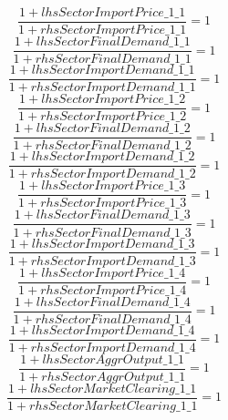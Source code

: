 \begin{dmath}
\frac{1+{lhsSectorImportPrice\_1\_1}}{1+{rhsSectorImportPrice\_1\_1}}=1
\end{dmath}
\begin{dmath}
\frac{1+{lhsSectorFinalDemand\_1\_1}}{1+{rhsSectorFinalDemand\_1\_1}}=1
\end{dmath}
\begin{dmath}
\frac{1+{lhsSectorImportDemand\_1\_1}}{1+{rhsSectorImportDemand\_1\_1}}=1
\end{dmath}
\begin{dmath}
\frac{1+{lhsSectorImportPrice\_1\_2}}{1+{rhsSectorImportPrice\_1\_2}}=1
\end{dmath}
\begin{dmath}
\frac{1+{lhsSectorFinalDemand\_1\_2}}{1+{rhsSectorFinalDemand\_1\_2}}=1
\end{dmath}
\begin{dmath}
\frac{1+{lhsSectorImportDemand\_1\_2}}{1+{rhsSectorImportDemand\_1\_2}}=1
\end{dmath}
\begin{dmath}
\frac{1+{lhsSectorImportPrice\_1\_3}}{1+{rhsSectorImportPrice\_1\_3}}=1
\end{dmath}
\begin{dmath}
\frac{1+{lhsSectorFinalDemand\_1\_3}}{1+{rhsSectorFinalDemand\_1\_3}}=1
\end{dmath}
\begin{dmath}
\frac{1+{lhsSectorImportDemand\_1\_3}}{1+{rhsSectorImportDemand\_1\_3}}=1
\end{dmath}
\begin{dmath}
\frac{1+{lhsSectorImportPrice\_1\_4}}{1+{rhsSectorImportPrice\_1\_4}}=1
\end{dmath}
\begin{dmath}
\frac{1+{lhsSectorFinalDemand\_1\_4}}{1+{rhsSectorFinalDemand\_1\_4}}=1
\end{dmath}
\begin{dmath}
\frac{1+{lhsSectorImportDemand\_1\_4}}{1+{rhsSectorImportDemand\_1\_4}}=1
\end{dmath}
\begin{dmath}
\frac{1+{lhsSectorAggrOutput\_1\_1}}{1+{rhsSectorAggrOutput\_1\_1}}=1
\end{dmath}
\begin{dmath}
\frac{1+{lhsSectorMarketClearing\_1\_1}}{1+{rhsSectorMarketClearing\_1\_1}}=1
\end{dmath}

